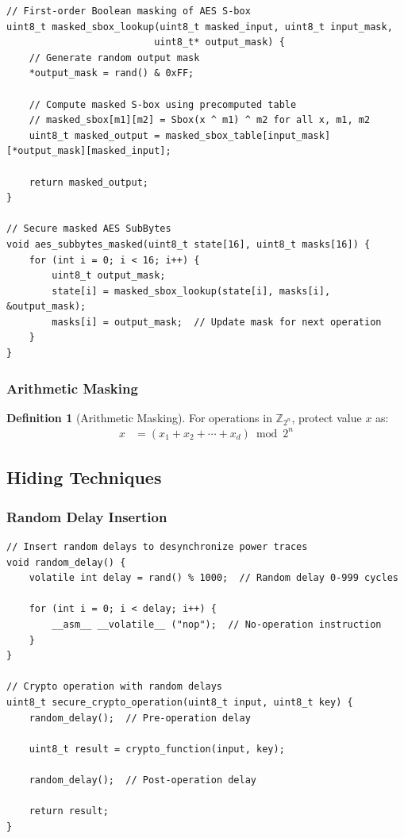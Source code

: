 \documentclass[11pt,a4paper]{article}
\theoremstyle{definition}
\newtheorem{definition}{Definition}[section]
\begin{document}
\begin{lstlisting}[caption={Boolean Masked AES S-box}]
// First-order Boolean masking of AES S-box
uint8_t masked_sbox_lookup(uint8_t masked_input, uint8_t input_mask, 
                          uint8_t* output_mask) {
    // Generate random output mask
    *output_mask = rand() & 0xFF;
    
    // Compute masked S-box using precomputed table
    // masked_sbox[m1][m2] = Sbox(x ^ m1) ^ m2 for all x, m1, m2
    uint8_t masked_output = masked_sbox_table[input_mask][*output_mask][masked_input];
    
    return masked_output;
}

// Secure masked AES SubBytes
void aes_subbytes_masked(uint8_t state[16], uint8_t masks[16]) {
    for (int i = 0; i < 16; i++) {
        uint8_t output_mask;
        state[i] = masked_sbox_lookup(state[i], masks[i], &output_mask);
        masks[i] = output_mask;  // Update mask for next operation
    }
}
\end{lstlisting}

\subsubsection{Arithmetic Masking}

\begin{definition}[Arithmetic Masking]
For operations in $\mathbb{Z}_{2^n}$, protect value $x$ as:
\begin{align}
x &= (x_1 + x_2 + \cdots + x_d) \bmod 2^n
\end{align}
\end{definition}

\subsection{Hiding Techniques}

\subsubsection{Random Delay Insertion}

\begin{lstlisting}[caption={Random Timing Countermeasure}]
// Insert random delays to desynchronize power traces
void random_delay() {
    volatile int delay = rand() % 1000;  // Random delay 0-999 cycles
    
    for (int i = 0; i < delay; i++) {
        __asm__ __volatile__ ("nop");  // No-operation instruction
    }
}

// Crypto operation with random delays
uint8_t secure_crypto_operation(uint8_t input, uint8_t key) {
    random_delay();  // Pre-operation delay
    
    uint8_t result = crypto_function(input, key);
    
    random_delay();  // Post-operation delay
    
    return result;
}
\end{lstlisting}
\end{document}
